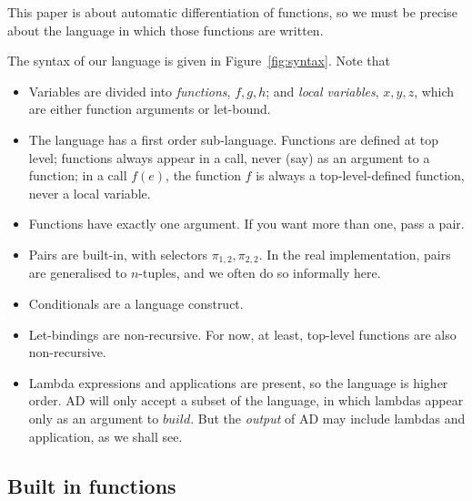 \documentclass[sigplan,review]{acmart}
\newcommand{\deriv}{\partial}  %
\newcommand{\gradf}[1]{\deriv\hspace{-0.15mm} #1}  %
\newcommand{\sel}[2]{\pi_{#1,#2}}
\newcommand{\buildfun}{\mathit{build}}
\newcommand{\simon}[1]{}
\newcommand{\awf}[1]{}
\begin{document}
This paper is about automatic differentiation of functions, so we must be precise about
the language in which those functions are written.

The syntax of our language is given in Figure~\ref{fig:syntax}.
Note that
\begin{itemize}
\item  Variables are divided into \emph{functions}, $f,g,h$; and \emph{local variables}, $x,y,z$,
  which are either function arguments or let-bound.
\item
  The language has a first order sub-language.  Functions are defined at top level;
  functions always appear in a call, never (say) as an argument to a
  function; in a call $f(e)$, the function $f$ is always a
  top-level-defined function, never a local variable.  \awf{at some point we should say where this restriction is needed}

\item Functions have exactly one argument. If you want more than one, pass a pair.

\item Pairs are built-in, with selectors $\sel{1}{2}, \sel{2}{2}$.
  In the real implementation, pairs are generalised to $n$-tuples, and we often do so informally here.

\item Conditionals are a language construct. \simon{Treating ``if'' as a function
  just didn't work; in particular $\gradf{if}$ needed a linear-map version of
  ``if'' and once we have that we might as well build ``if'' in.  Anyway,
  conditionals are very fundamental, so it's unsurprising.}

\item Let-bindings are non-recursive. For now, at least, top-level
  functions are also non-recursive.  \simon{I think that top-level
    recursive functions might be OK, but I don't want to think about
    that yet.}

\item Lambda expressions and applications are present, so the language
  is higher order.  AD will only accept a subset of the language, in
  which lambdas appear only as an argument to $\buildfun$.  But the
  \emph{output} of AD may include lambdas and application, as we shall see.
  \end{itemize}

\subsection{Built in functions}
\end{document}
